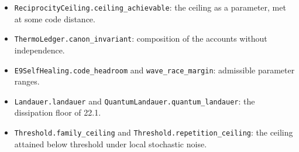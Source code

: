 \documentclass[
]{article}
\providecommand{\tightlist}{%
  \setlength{\itemsep}{0pt}\setlength{\parskip}{0pt}}
\begin{document}
\begin{itemize}
\tightlist
\item
  \texttt{R\allowbreak{}e\allowbreak{}c\allowbreak{}i\allowbreak{}p\allowbreak{}r\allowbreak{}o\allowbreak{}c\allowbreak{}i\allowbreak{}t\allowbreak{}y\allowbreak{}C\allowbreak{}e\allowbreak{}i\allowbreak{}l\allowbreak{}i\allowbreak{}n\allowbreak{}g\allowbreak{}.\allowbreak{}c\allowbreak{}e\allowbreak{}i\allowbreak{}l\allowbreak{}i\allowbreak{}n\allowbreak{}g\allowbreak{}\_\allowbreak{}a\allowbreak{}c\allowbreak{}h\allowbreak{}i\allowbreak{}e\allowbreak{}v\allowbreak{}a\allowbreak{}b\allowbreak{}l\allowbreak{}e}:
  the ceiling as a parameter, met at some code distance.
\item
  \texttt{T\allowbreak{}h\allowbreak{}e\allowbreak{}r\allowbreak{}m\allowbreak{}o\allowbreak{}L\allowbreak{}e\allowbreak{}d\allowbreak{}g\allowbreak{}e\allowbreak{}r\allowbreak{}.\allowbreak{}c\allowbreak{}a\allowbreak{}n\allowbreak{}o\allowbreak{}n\allowbreak{}\_\allowbreak{}i\allowbreak{}n\allowbreak{}v\allowbreak{}a\allowbreak{}r\allowbreak{}i\allowbreak{}a\allowbreak{}n\allowbreak{}t}:
  composition of the accounts without independence.
\item
  \texttt{E\allowbreak{}9\allowbreak{}S\allowbreak{}e\allowbreak{}l\allowbreak{}f\allowbreak{}H\allowbreak{}e\allowbreak{}a\allowbreak{}l\allowbreak{}i\allowbreak{}n\allowbreak{}g\allowbreak{}.\allowbreak{}c\allowbreak{}o\allowbreak{}d\allowbreak{}e\allowbreak{}\_\allowbreak{}h\allowbreak{}e\allowbreak{}a\allowbreak{}d\allowbreak{}r\allowbreak{}o\allowbreak{}o\allowbreak{}m}
  and \texttt{wave\_race\_margin}: admissible parameter ranges.
\item
  \texttt{L\allowbreak{}a\allowbreak{}n\allowbreak{}d\allowbreak{}a\allowbreak{}u\allowbreak{}e\allowbreak{}r\allowbreak{}.\allowbreak{}l\allowbreak{}a\allowbreak{}n\allowbreak{}d\allowbreak{}a\allowbreak{}u\allowbreak{}e\allowbreak{}r}
  and
  \texttt{Q\allowbreak{}u\allowbreak{}a\allowbreak{}n\allowbreak{}t\allowbreak{}u\allowbreak{}m\allowbreak{}L\allowbreak{}a\allowbreak{}n\allowbreak{}d\allowbreak{}a\allowbreak{}u\allowbreak{}e\allowbreak{}r\allowbreak{}.\allowbreak{}q\allowbreak{}u\allowbreak{}a\allowbreak{}n\allowbreak{}t\allowbreak{}u\allowbreak{}m\allowbreak{}\_\allowbreak{}l\allowbreak{}a\allowbreak{}n\allowbreak{}d\allowbreak{}a\allowbreak{}u\allowbreak{}e\allowbreak{}r}:
  the dissipation floor of 22.1.
\item
  \texttt{T\allowbreak{}h\allowbreak{}r\allowbreak{}e\allowbreak{}s\allowbreak{}h\allowbreak{}o\allowbreak{}l\allowbreak{}d\allowbreak{}.\allowbreak{}f\allowbreak{}a\allowbreak{}m\allowbreak{}i\allowbreak{}l\allowbreak{}y\allowbreak{}\_\allowbreak{}c\allowbreak{}e\allowbreak{}i\allowbreak{}l\allowbreak{}i\allowbreak{}n\allowbreak{}g}
  and
  \texttt{T\allowbreak{}h\allowbreak{}r\allowbreak{}e\allowbreak{}s\allowbreak{}h\allowbreak{}o\allowbreak{}l\allowbreak{}d\allowbreak{}.\allowbreak{}r\allowbreak{}e\allowbreak{}p\allowbreak{}e\allowbreak{}t\allowbreak{}i\allowbreak{}t\allowbreak{}i\allowbreak{}o\allowbreak{}n\allowbreak{}\_\allowbreak{}c\allowbreak{}e\allowbreak{}i\allowbreak{}l\allowbreak{}i\allowbreak{}n\allowbreak{}g}:
  the ceiling attained below threshold under local stochastic noise.
\end{itemize}
\end{document}
